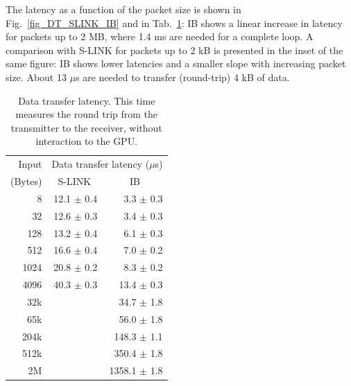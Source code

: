 \documentclass[journal]{IEEEtran}
\begin{document}
The latency as a function of the packet size is shown in 
Fig.~\ref{fig_DT_SLINK_IB} and in Tab.~\ref{tab_DT}: 
IB shows a linear increase in latency for 
packets up to 2 MB, where 1.4 ms are needed for a complete loop.
A comparison with S-LINK for packets up to 2 kB is presented in the 
inset of the same figure: IB shows lower latencies and a 
smaller slope with increasing packet size. About 13 $\mu$s are needed to 
transfer (round-trip) 4 kB of data. 

\begin{table}[!t]
  \centering
  \begin{tabular}{|r||r|r|}
    \hline
    
    Input  & \multicolumn{2}{|c|}{Data transfer latency ($\mu$s)}  \\     

    (Bytes) & \multicolumn{1}{|c|}{S-LINK}   & \multicolumn{1}{|c|}{IB}\\

    \hline
    \hline
    8    & 12.1 $\pm$ 0.4 & 3.3    $\pm$ 0.3 \\
    32   & 12.6 $\pm$ 0.3 & 3.4    $\pm$ 0.3 \\
    128  & 13.2 $\pm$ 0.4 & 6.1    $\pm$ 0.3 \\
    512  & 16.6 $\pm$ 0.4 & 7.0    $\pm$ 0.2 \\
    1024 & 20.8 $\pm$ 0.2 & 8.3    $\pm$ 0.2 \\
    4096 & 40.3 $\pm$ 0.3 & 13.4   $\pm$ 0.3 \\
    32k  &                & 34.7   $\pm$ 1.8 \\
    65k  &                & 56.0   $\pm$ 1.8 \\
    204k &                & 148.3  $\pm$ 1.1\\
    512k &                & 350.4  $\pm$ 1.8\\
    2M   &                & 1358.1 $\pm$ 1.8\\
    
    \hline
  \end{tabular}
\caption{Data transfer latency. This time measures the round trip 
from the transmitter to the receiver, without interaction to the GPU. }
\label{tab_DT}
\end{table}
\end{document}
